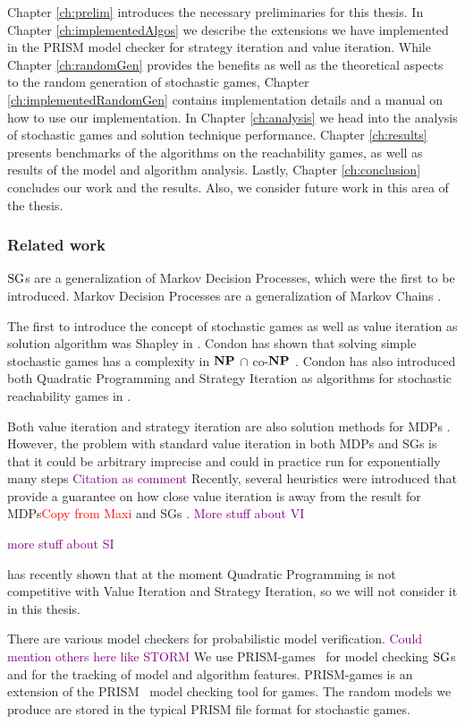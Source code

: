 Chapter \ref{ch:prelim} introduces the necessary preliminaries for this thesis.
In Chapter \ref{ch:implementedAlgos} we describe the extensions we have implemented in the PRISM model checker for strategy iteration and value iteration.
While Chapter \ref{ch:randomGen} provides the benefits as well as the theoretical aspects to the random generation of stochastic games,
Chapter \ref{ch:implementedRandomGen} contains implementation details and a manual on how to use our implementation.
In Chapter \ref{ch:analysis} we head into the analysis of stochastic games and solution technique performance.
Chapter \ref{ch:results} presents benchmarks of the algorithms on the reachability games, as well as results of the model and algorithm analysis.
Lastly, Chapter \ref{ch:conclusion} concludes our work and the results. Also, we consider future work in this area of the thesis.

\subsubsection{Related work}
$\textrm{SG}$s are a generalization of Markov Decision Processes, which were the first to be introduced. 
Markov Decision Processes are a generalization of Markov Chains \cite{Puterman} \cite[Ch.~11]{introProb}.

The first to introduce the concept of stochastic games as well as value iteration as solution algorithm was Shapley in \cite{shapley}.
Condon has shown that solving simple stochastic games has a complexity in $\mathbf{NP}$ $\cap$ co-$\mathbf{NP}$ \cite{condonComplexity}.
Condon has also introduced both Quadratic Programming and Strategy Iteration as algorithms for stochastic reachability games in \cite{condonQP}. 

Both value iteration and strategy iteration are also solution methods for MDPs \cite{Puterman}\cite{https://pubsonline.informs.org/doi/abs/10.1287/mnsc.12.5.359 - Strategy Iteration for MDPs}.
However, the problem with standard value iteration in both MDPs and SGs is that it could be arbitrary imprecise \cite{haddadmonmege} and 
could in practice run for exponentially many steps \textcolor{purple}{Citation as comment}%
Recently, several heuristics were introduced that provide a guarantee on how close value iteration is away from the result for MDPs\textcolor{red}{Copy from Maxi} and SGs \cite{paperMaxi}.
\textcolor{purple}{More stuff about VI}

\textcolor{purple}{more stuff about SI}

\cite{GANDALF} has recently shown that at the moment Quadratic Programming is not competitive with Value Iteration and Strategy Iteration,
so we will not consider it in this thesis.

There are various model checkers for probabilistic model verification. \textcolor{purple}{Could mention others here like STORM}
We use PRISM-games~\cite{PRISM-games} for model checking $\textrm{SG}$s and for the tracking of model and algorithm features.
PRISM-games is an extension of the PRISM~\cite{PRISM} model checking tool for games. The random models we produce are stored in the
typical PRISM file format for stochastic games.
